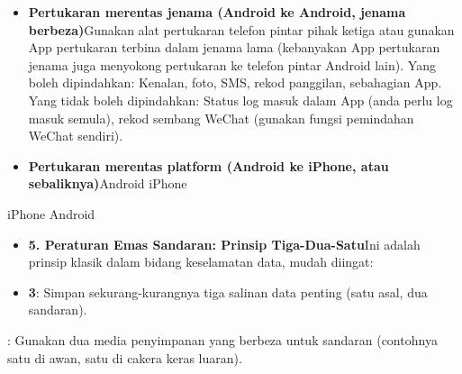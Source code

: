 \begin{itemize}
  \item \textbf{Pertukaran merentas jenama (Android ke Android, jenama berbeza)}Gunakan alat pertukaran telefon pintar pihak ketiga atau gunakan App pertukaran terbina dalam jenama lama (kebanyakan App pertukaran jenama juga menyokong pertukaran ke telefon pintar Android lain). Yang boleh dipindahkan: Kenalan, foto, SMS, rekod panggilan, sebahagian App. Yang tidak boleh dipindahkan: Status log masuk dalam App (anda perlu log masuk semula), rekod sembang WeChat (gunakan fungsi pemindahan WeChat sendiri).
  \item \textbf{Pertukaran merentas platform (Android ke iPhone, atau sebaliknya)}Android iPhone
\end{itemize}


iPhone Android


\begin{itemize}
  \item \textbf{5. Peraturan Emas Sandaran: Prinsip Tiga-Dua-Satu}Ini adalah prinsip klasik dalam bidang keselamatan data, mudah diingat:
  \item \textbf{3}: Simpan sekurang-kurangnya tiga salinan data penting (satu asal, dua sandaran).
\end{itemize}


: Gunakan dua media penyimpanan yang berbeza untuk sandaran (contohnya satu di awan, satu di cakera keras luaran).

